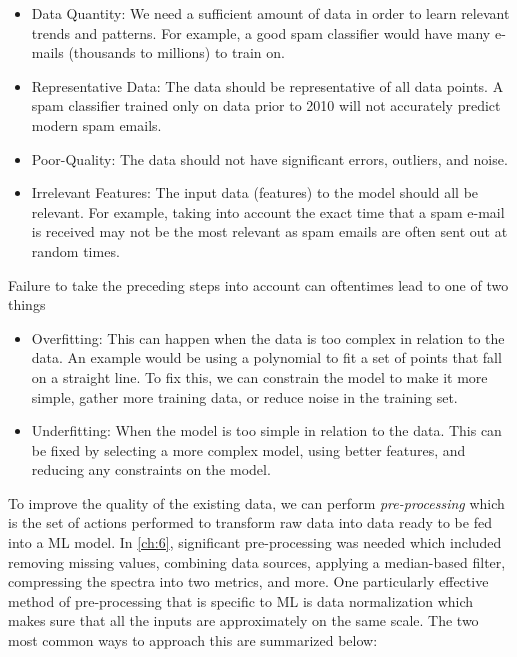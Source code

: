 \begin{itemize}
	\item Data Quantity: We need a sufficient amount of data in order to learn relevant trends and patterns. For example, a good spam classifier would have many e-mails (thousands to millions) to train on.
	\item Representative Data: The data should be representative of all data points. A spam classifier trained only on data prior to 2010 will not accurately predict modern spam emails.
	\item Poor-Quality: The data should not have significant errors, outliers, and noise. 
	\item Irrelevant Features: The input data (features) to the model should all be relevant. For example, taking into account the exact time that a spam e-mail is received may not be the most relevant as spam emails are often sent out at random times. 
\end{itemize}
Failure to take the preceding steps into account can oftentimes lead to one of two things

\begin{itemize}
	\item Overfitting: This can happen when the data is too complex in relation to the data. An example would be using a polynomial to fit a set of points that fall on a straight line. To fix this, we can constrain the model to make it more simple, gather more training data, or reduce noise in the training set.
	\item Underfitting: When the model is too simple in relation to the data. This can be fixed by selecting a more complex model, using better features, and reducing any constraints on the model.
\end{itemize} 
To improve the quality of the existing data, we can perform \emph{pre-processing} which is the set of actions performed to transform raw data into data ready to be fed into a \gls{ML} model. In \autoref{ch:6}, significant pre-processing was needed which included removing missing values, combining data sources, applying a median-based filter, compressing the spectra into two metrics, and more. One particularly effective method of pre-processing that is specific to \gls{ML} is data normalization which makes sure that all the inputs are approximately on the same scale. The two most common ways to approach this are summarized below: 

